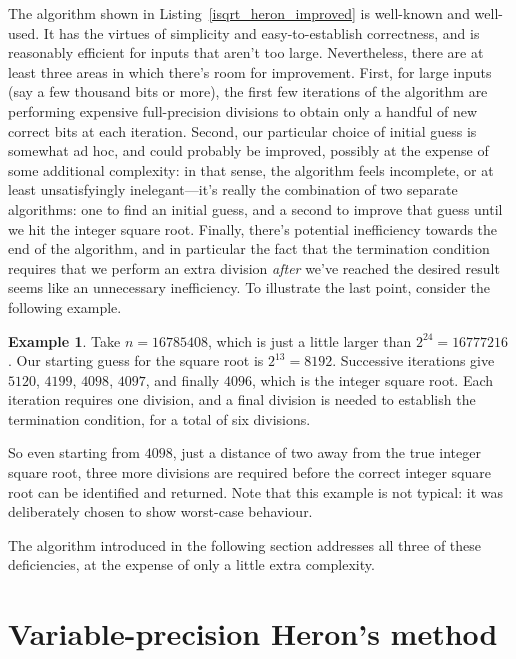 \documentclass[a4paper]{article}
\theoremstyle{plain}
\theoremstyle{definition}
\newtheorem{example}[theorem]{Example}
\begin{document}
The algorithm shown in Listing~\ref{isqrt_heron_improved} is well-known and
well-used. It has the virtues of simplicity and easy-to-establish correctness,
and is reasonably efficient for inputs that aren't too large. Nevertheless,
there are at least three areas in which there's room for improvement. First,
for large inputs (say a few thousand bits or more), the first few iterations of
the algorithm are performing expensive full-precision divisions to obtain only
a handful of new correct bits at each iteration. Second, our particular choice
of initial guess is somewhat ad hoc, and could probably be improved, possibly
at the expense of some additional complexity: in that sense, the algorithm
feels incomplete, or at least unsatisfyingly inelegant---it's really the
combination of two separate algorithms: one to find an initial guess, and a
second to improve that guess until we hit the integer square root. Finally,
there's potential inefficiency towards the end of the algorithm, and in
particular the fact that the termination condition requires that we perform an
extra division \emph{after} we've reached the desired result seems like an
unnecessary inefficiency. To illustrate the last point, consider the following
example.

\begin{example}
  Take $n = 16785408$, which is just a little larger than $2^{24} = 16777216$.
  Our starting guess for the square root is $2^{13} = 8192$. Successive
  iterations give $5120$, $4199$, $4098$, $4097$, and finally $4096$, which
  is the integer square root. Each iteration requires one division, and
  a final division is needed to establish the termination condition, for
  a total of six divisions.
\end{example}

So even starting from $4098$, just a distance of two away from the true integer
square root, three more divisions are required before the correct integer
square root can be identified and returned. Note that this example is not
typical: it was deliberately chosen to show worst-case behaviour.

The algorithm introduced in the following section addresses all three of these
deficiencies, at the expense of only a little extra complexity.

\section{Variable-precision Heron's method}
\label{new_method}
\end{document}
